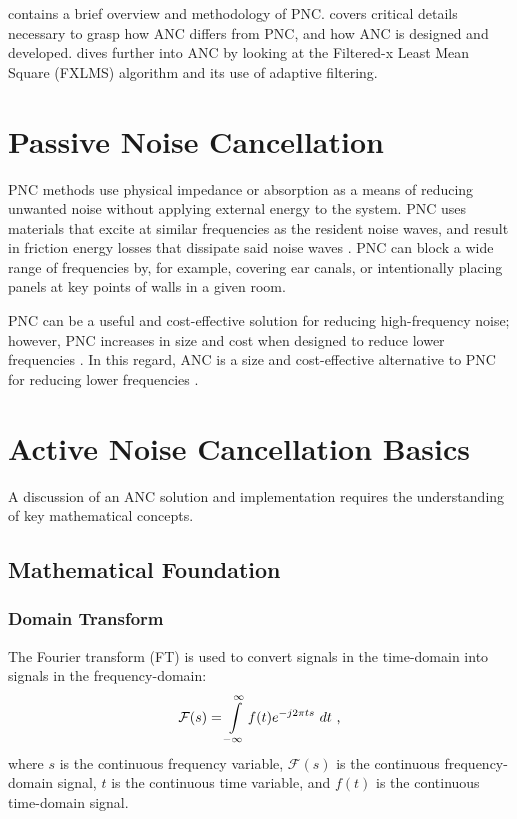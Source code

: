 \documentclass[11pt]{article}
\begin{document}
 contains a brief overview and methodology of PNC.  covers critical details necessary to grasp how ANC differs from PNC, and how ANC is designed and developed.  dives further into ANC by looking at the Filtered-x Least Mean Square (FXLMS) algorithm and its use of adaptive filtering.

\section{Passive Noise Cancellation}
\label{sec:PNC}

PNC methods use physical impedance or absorption as a means of reducing unwanted noise without applying external energy to the system. PNC uses materials that excite at similar frequencies as the resident noise waves, and result in friction energy losses that dissipate said noise waves \cite{lu}. PNC can block a wide range of frequencies by, for example, covering ear canals, or intentionally placing panels at key points of walls in a given room.

PNC can be a useful and cost-effective solution for reducing high-frequency noise; however, PNC increases in size and cost when designed to reduce lower frequencies \cite{kuo}. In this regard, ANC is a size and cost-effective alternative to PNC for reducing lower frequencies \cite{kuo}.

\pagebreak

\section{Active Noise Cancellation Basics}
\label{sec:ANC_Basics}

A discussion of an ANC solution and implementation requires the understanding of key mathematical concepts.

\subsection{Mathematical Foundation}

\subsubsection{Domain Transform}

The Fourier transform (FT) is used to convert signals in the time-domain into signals in the frequency-domain:
\begin{equation}
    \mathcal{F}(s) = \int \limits_{-\infty}^\infty f(t) e^{-j 2 \pi t s}\ dt \text{ ,}
\end{equation}
where $s$ is the continuous frequency variable, $\mathcal{F}(s)$ is the continuous frequency-domain signal, $t$ is the continuous time variable, and $f(t)$ is the continuous time-domain signal.
\end{document}
